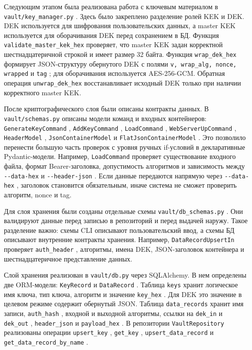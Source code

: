 \documentclass[14pt, a4paper]{extarticle}
\renewcommand{\texttt}[1]{%
  {\def\UrlFont{\ttfamily}\nolinkurl{#1}}%
}
\begin{document}
	Следующим этапом была реализована работа с ключевым материалом в \texttt{vault/key\_manager.py}. Здесь было закреплено разделение ролей KEK и DEK. DEK используется для шифрования пользовательских данных, а master KEK используется для оборачивания DEK перед сохранением в БД. Функция \texttt{validate\_master\_kek\_hex} проверяет, что master KEK задан корректной шестнадцатеричной строкой и имеет размер 32 байта. Функция \texttt{wrap\_dek\_hex} формирует JSON-структуру обернутого DEK с полями \texttt{v, wrap\_alg, nonce, wrapped} и \texttt{tag}; для оборачивания используется AES-256-GCM. Обратная операция \texttt{unwrap\_dek\_hex} восстанавливает исходный DEK только при наличии корректного master KEK.
		
	После криптографического слоя были описаны контракты данных. В \texttt{vault/schemas.py} описаны модели команд и входных контейнеров: \texttt{GenerateKeyCommand}, \texttt{AddKeyCommand}, \texttt{LoadCommand}, \texttt{WebServerUpCommand}, \texttt{HeaderModel}, \texttt{JsonContainerModel} и \texttt{FlatJsonContainerModel}. Это позволило перенести большую часть проверок с уровня ручных if-условий в декларативные Pydantic-модели. Например, \texttt{LoadCommand} проверяет существование входного файла, формат Bearer-заголовка, допустимость алгоритмов и зависимость между \texttt{--data-hex} и \texttt{--header-json}. Если данные передаются напрямую через \texttt{--data-hex}, заголовок становится обязательным, иначе система не сможет проверить алгоритм, nonce и tag.
	
	Для слоя хранения были созданы отдельные схемы \texttt{vault/db\_schemas.py}. Они валидируют данные перед записью в репозиторий и перед выдачей наружу. Такое разделение важно: схемы CLI описывают пользовательский ввод, а схемы БД описывают внутренние контракты хранения. Например, \texttt{DataRecordUpsertIn} проверяет \texttt{auth\_header}, алгоритмы, имена DEK, JSON-заголовок контейнера и шестнадцатеричное представление данных. 
	
	Слой хранения реализован в \texttt{vault/db.py} через SQLAlchemy. В нем определены две ORM-модели: \texttt{KeyRecord} и \texttt{DataRecord}. Таблица \texttt{keys} хранит логическое имя ключа, тип ключа, алгоритм и значение \texttt{key\_hex}. Для DEK это значение в целевом режиме содержит обернутый JSON. Таблица \texttt{data\_records} хранит имя записи, \texttt{auth\_hash}, входной и выходной алгоритмы, ссылки на \texttt{dek\_in} и \texttt{dek\_out}, \texttt{header\_json} и \texttt{payload\_hex}. В репозитории \texttt{VaultRepository} реализованы операции \texttt{upsert\_key}, \texttt{get\_key}, \texttt{upsert\_data\_record} и \texttt{get\_data\_record\_by\_name}.
	
\end{document}
